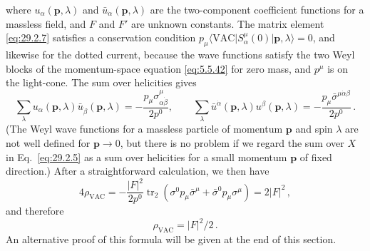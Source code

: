 where \(u_\alpha(\mathbf p,\lambda)\) and
\(\bar u_{\dot\alpha}(\mathbf p,\lambda)\) are the two-component
coefficient functions for a massless field, and \(F\) and \(F'\) are unknown
constants. The matrix element \eqref{eq:29.2.7} satisfies a conservation
condition
\(p_\mu\langle\mathrm{VAC}\lvert S^\mu_\alpha(0)
\rvert\mathbf p,\lambda\rangle=0\), and likewise for the dotted current,
because the wave functions satisfy the two Weyl blocks of the
momentum-space equation \eqref{eq:5.5.42} for zero
mass, and \(p^\mu\) is on the light-cone. The sum over helicities gives
\[
  \sum_\lambda
    u_\alpha(\mathbf p,\lambda)\bar u_{\dot\beta}(\mathbf p,\lambda)
  =-\frac{p_\mu\sigma^\mu_{\alpha\dot\beta}}{2p^0},
  \qquad
  \sum_\lambda
    \bar u^{\dot\alpha}(\mathbf p,\lambda)u^\beta(\mathbf p,\lambda)
  =-\frac{p_\mu\bar\sigma^{\mu\dot\alpha\beta}}{2p^0}\,.
\]
(The Weyl wave functions for a massless particle of
momentum \(\mathbf p\) and spin \(\lambda\) are not well defined for
\(\mathbf p\to0\), but there is no problem if we regard the sum over
\(X\) in Eq.~\eqref{eq:29.2.5} as a sum over helicities for a small
momentum \(\mathbf p\) of fixed direction.) After a straightforward
calculation, we then have
\[
  4\rho_{\mathrm{VAC}}
  =-\frac{\lvert F\rvert^2}{2p^0}
    \operatorname{tr}_2\left(
      \sigma^0p_\mu\bar\sigma^\mu
      +\bar\sigma^0p_\mu\sigma^\mu\right)
  =2\lvert F\rvert^2\,,
\]
and therefore
\begin{equation}
  \rho_{\mathrm{VAC}}=\lvert F\rvert^2/2\,.
  \tag{29.2.8}\label{eq:29.2.8}
\end{equation}
An alternative proof of this formula will be given at the end of this
section.

